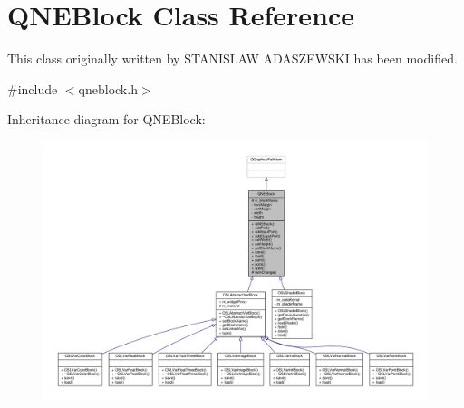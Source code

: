 \hypertarget{class_q_n_e_block}{\section{Q\-N\-E\-Block Class Reference}
\label{class_q_n_e_block}
}


This class originally written by S\-T\-A\-N\-I\-S\-L\-A\-W A\-D\-A\-S\-Z\-E\-W\-S\-K\-I has been modified.  




{\ttfamily \#include $<$qneblock.\-h$>$}



Inheritance diagram for Q\-N\-E\-Block\-:
\nopagebreak
\begin{figure}[H]
\begin{center}
\leavevmode
\includegraphics[width=350pt]{class_q_n_e_block__inherit__graph}
\end{center}
\end{figure}


